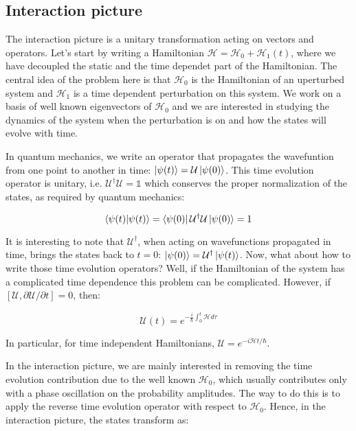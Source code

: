 \subsection{Interaction picture}

The interaction picture is a unitary transformation acting on vectors and operators. Let's start by writing a Hamiltonian $\mathcal{H} = \mathcal{H}_{0} + \mathcal{H}_{1}(t)$, where we have decoupled the static and the time dependet part of the Hamiltonian. The central idea of the problem here is that $\mathcal{H}_{0}$ is the Hamiltonian of an uperturbed system and $\mathcal{H}_{1}$ is a time dependent perturbation on this system. We work on a basis of well known eigenvectors of $\mathcal{H}_{0}$ and we are interested in studying the dynamics of the system when the perturbation is on and how the states will evolve with time. 

In quantum mechanics, we write an operator that propagates the wavefuntion from one point to another in time: $\ket{\psi(t)} = \mathcal{U} \ket{\psi(0)}$. This time evolution operator is unitary, i.e. $\mathcal{U}^{\dagger} \mathcal{U} = \mathbb{1}$ which conserves the proper normalization of the states, as required by quantum mechanics:

\begin{equation}
    \bra{\psi(t)} \ket{\psi(t)} = \bra{\psi(0)} \mathcal{U}^{\dagger}\mathcal{U} \ket{\psi(0)} = 1
\end{equation}

It is interesting to note that $\mathcal{U}^{\dagger}$, when acting on wavefunctions propagated in time, brings the states back to $t=0$: $\ket{\psi(0)} = \mathcal{U}^{\dagger} \ket{\psi(t)}$. Now, what about how to write those time evolution operators? Well, if the Hamiltonian of the system has a complicated time dependence this problem can be complicated. However, if $[\mathcal{U}, \partial\mathcal{U}/\partial t] = 0$, then:

\begin{equation}
    \mathcal{U} (t) = e^{ - \frac{i}{\hbar} \int ^{t}_{0} \mathcal{H} d\tau}
\end{equation}

In particular, for time independent Hamiltonians, $\mathcal{U} = e^{-i\mathcal{H}t / \hbar}$. 

In the interaction picture, we are mainly interested in removing the time evolution contribution due to the well known $\mathcal{H}_{0}$, which usually contributes only with a phase oscillation on the probability amplitudes. The way to do this is to apply the reverse time evolution operator with respect to $\mathcal{H}_{0}$. Hence, in the interaction picture, the states transform as:

